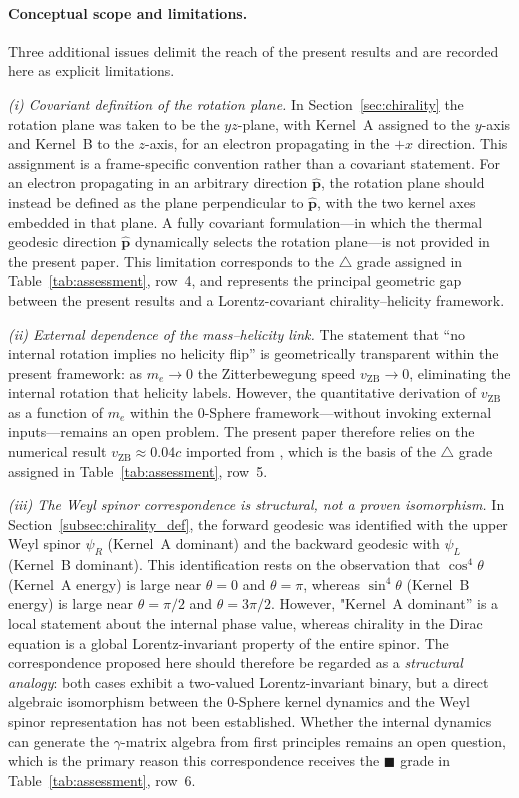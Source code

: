 \documentclass[%
 reprint, amsmath,amssymb, aps, prb, ]{revtex4-2}
\numberwithin{equation}{section}
\newcommand{\iphase}{\theta}
\begin{document}
\paragraph{Conceptual scope and limitations.}
Three additional issues delimit the reach of the present results and are recorded here as explicit limitations.

\textit{(i) Covariant definition of the rotation plane.} In Section~\ref{sec:chirality} the rotation plane was taken to be the $yz$-plane, with Kernel~A assigned to the $y$-axis and Kernel~B to the $z$-axis, for an electron propagating in the $+x$ direction. This assignment is a frame-specific convention rather than a covariant statement. For an electron propagating in an arbitrary direction $\hat{\mathbf{p}}$, the rotation plane should instead be defined as the plane perpendicular to $\hat{\mathbf{p}}$, with the two kernel axes embedded in that plane. A fully covariant formulation—in which the thermal geodesic direction $\hat{\mathbf{p}}$ dynamically selects the rotation plane—is not provided in the present paper. This limitation corresponds to the $\triangle$ grade assigned in Table~\ref{tab:assessment}, row~4, and represents the principal geometric gap between the present results and a Lorentz-covariant chirality–helicity framework.

\textit{(ii) External dependence of the mass--helicity link.} The statement that ``no internal rotation implies no helicity flip'' is geometrically transparent within the present framework: as $m_e \to 0$ the Zitterbewegung speed $v_{\mathrm{ZB}} \to 0$, eliminating the internal rotation that helicity labels. However, the quantitative derivation of $v_{\mathrm{ZB}}$ as a function of $m_e$ within the 0-Sphere framework—without invoking external inputs—remains an open problem. The present paper therefore relies on the numerical result $v_{\mathrm{ZB}} \approx 0.04c$ imported from \cite{hanamura10}, which is the basis of the $\triangle$ grade assigned in Table~\ref{tab:assessment}, row~5.

\textit{(iii) The Weyl spinor correspondence is structural, not a proven isomorphism.} In Section~\ref{subsec:chirality_def}, the forward geodesic was identified with the upper Weyl spinor $\psi_R$ (Kernel~A dominant) and the backward geodesic with $\psi_L$ (Kernel~B dominant). This identification rests on the observation that $\cos^4\iphase$ (Kernel~A energy) is large near $\iphase = 0$ and $\iphase = \pi$, whereas $\sin^4\iphase$ (Kernel~B energy) is large near $\iphase = \pi/2$ and $\iphase = 3\pi/2$. However, "Kernel~A dominant'' is a local statement about the internal phase value, whereas chirality in the Dirac equation is a global Lorentz-invariant property of the entire spinor. The correspondence proposed here should therefore be regarded as a \emph{structural analogy}: both cases exhibit a two-valued Lorentz-invariant binary, but a direct algebraic isomorphism between the 0-Sphere kernel dynamics and the Weyl spinor representation has not been established. Whether the internal dynamics can generate the $\gamma$-matrix algebra from first principles remains an open question, which is the primary reason this correspondence receives the $\blacksquare$ grade in Table~\ref{tab:assessment}, row~6.
\end{document}
